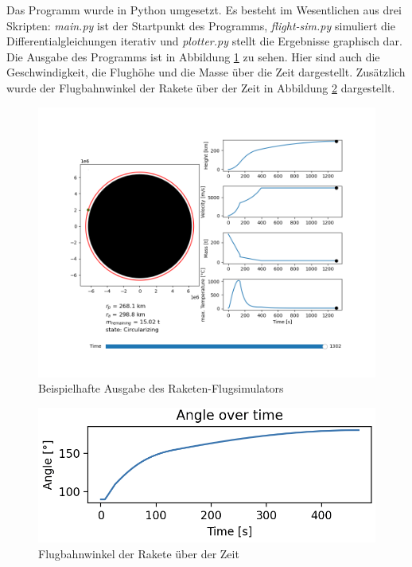 \documentclass[12pt]{article}
\begin{document}
Das Programm wurde in Python umgesetzt. Es besteht im Wesentlichen aus drei Skripten: \textit{main.py} ist der Startpunkt des Programms, \textit{flight-sim.py} simuliert die Differentialgleichungen iterativ und \textit{plotter.py} stellt die Ergebnisse graphisch dar. Die Ausgabe des Programms ist in Abbildung \ref{fig:output} zu sehen. Hier sind auch die Geschwindigkeit, die Flughöhe und die Masse über die Zeit dargestellt. Zusätzlich wurde der Flugbahnwinkel der Rakete über der Zeit in Abbildung \ref{fig:angle} dargestellt. 
\begin{figure}
    \centering
    \includegraphics[width=1\textwidth]{images/output.png}
    \caption{Beispielhafte Ausgabe des Raketen-Flugsimulators}
    \label{fig:output}
\end{figure}

\begin{figure}
    \centering
    \includegraphics[width=.8\textwidth]{images/angle_over_time.png}
    \caption{Flugbahnwinkel der Rakete über der Zeit}
    \label{fig:angle}
\end{figure}
\end{document}
